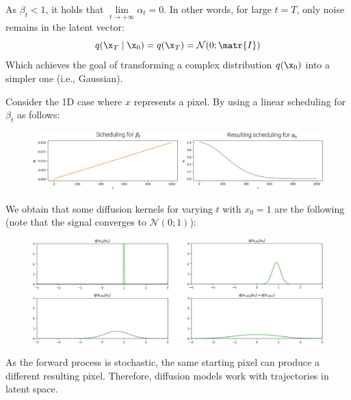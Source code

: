 \begin{description}
        \begin{remark}
            As $\beta_t < 1$, it holds that $\lim\limits_{t \rightarrow +\infty} \alpha_t = 0$. In other words, for large $t = T$, only noise remains in the latent vector:
            \[ q(\x_T \mid \x_0) = q(\x_T) = \mathcal{N}(0; \matr{I}) \]
            Which achieves the goal of transforming a complex distribution $q(\x_0)$ into a simpler one (i.e., Gaussian).
        \end{remark}

        \begin{example}
            Consider the 1D case where $x$ represents a pixel. By using a linear scheduling for $\beta_t$ as follows:
            \begin{figure}[H]
                \centering
                \includegraphics[width=0.9\linewidth]{./img/diffusion_kernel_example1.jpg}
            \end{figure}
            We obtain that some diffusion kernels for varying $t$ with $x_0 = 1$ are the following (note that the signal converges to $\mathcal{N}(0; 1)$):
            \begin{figure}[H]
                \centering
                \includegraphics[width=0.9\linewidth]{./img/diffusion_kernel_example2.jpg}
            \end{figure}
        \end{example}

        \begin{remark}
            As the forward process is stochastic, the same starting pixel can produce a different resulting pixel. Therefore, diffusion models work with trajectories in latent space.


\end{remark}
\end{description}

